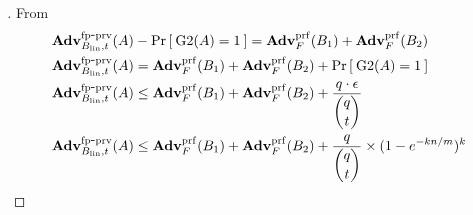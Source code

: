 \begin{proof}[]
\noindent
From  \\
\begin{align}
\nonumber \AdvFPSecHash{B_{\mathrm{lin}},t}{A} &- \Prob{\game{2}(A)=1} =  \AdvPRF{F}{B_1} + \AdvPRF{F}{B_2}   \\
\nonumber \AdvFPSecHash{B_{\mathrm{lin}},t}{A}  &=  \AdvPRF{F}{B_1} + \AdvPRF{F}{B_2} + \Prob{\game{2}(A)=1}  \\
\nonumber \AdvFPSecHash{B_{\mathrm{lin}},t}{A} &\leq  \AdvPRF{F}{B_1} + \AdvPRF{F}{B_2}  + \frac{q \cdot \epsilon}{\dbinom{q}{t}}\\
\AdvFPSecHash{B_{\mathrm{lin}},t}{A} &\leq  \AdvPRF{F}{B_1} + \AdvPRF{F}{B_2}  + \frac{q}{\dbinom{q}{t}} \times  (1-e^{-kn/m})^k
\end{align}
\end{proof}

